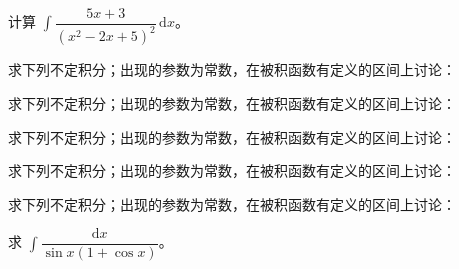 \noindent\begin{minipage}{\textwidth}
计算 $\int\dfrac{5x+3}{(x^2-2x+5)^2}\,\mathrm dx$。
\end{minipage}\par\vfill
\newpage
\noindent\begin{minipage}{\textwidth}
求下列不定积分；出现的参数为常数，在被积函数有定义的区间上讨论：
\end{minipage}\par\vfill
\noindent\begin{minipage}{\textwidth}
求下列不定积分；出现的参数为常数，在被积函数有定义的区间上讨论：
\end{minipage}\par\vfill
\noindent\begin{minipage}{\textwidth}
求下列不定积分；出现的参数为常数，在被积函数有定义的区间上讨论：
\end{minipage}\par\vfill
\newpage
\noindent\begin{minipage}{\textwidth}
求下列不定积分；出现的参数为常数，在被积函数有定义的区间上讨论：
\end{minipage}\par\vfill
\noindent\begin{minipage}{\textwidth}
求下列不定积分；出现的参数为常数，在被积函数有定义的区间上讨论：
\end{minipage}\par\vfill
\noindent\begin{minipage}{\textwidth}
求 $\int\dfrac{\mathrm dx}{\sin x(1+\cos x)}$。
\end{minipage}\par\vfill
